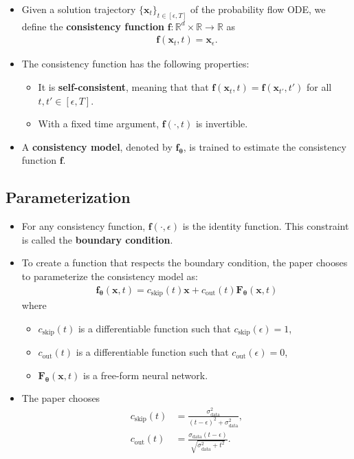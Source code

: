 \documentclass[10pt]{article}
\newcommand{\ve}[1]{\mathbf{#1}}
\newcommand{\ves}[1]{\boldsymbol{#1}}
\newcommand{\mrm}[1]{\mathrm{#1}}
\newcommand{\Real}{\mathbb{R}}
\newcommand{\data}{\mathrm{data}}
\begin{document}
\begin{itemize}
  \item Given a solution trajectory $\{ \ve{x}_t \}_{t \in [\epsilon,T]}$ of the probability flow ODE, we define the {\bf consistency function} $\ve{f}: \Real^d \times \Real \rightarrow \Real$ as
  \begin{align*}
    \ve{f}(\ve{x}_t, t) = \ve{x}_\epsilon.
  \end{align*}
  
  \item The consistency function has the following properties:
  \begin{itemize}
    \item It is {\bf self-consistent}, meaning that that $\ve{f}(\ve{x}_t, t) = \ve{f}(\ve{x}_{t'}, t')$ for all $t, t' \in [\epsilon, T]$.
    \item With a fixed time argument, $\ve{f}(\cdot, t)$ is invertible.
  \end{itemize}
  
  \item A {\bf consistency model}, denoted by $\ve{f}_{\ves{\theta}}$, is trained to estimate the consistency function $\ve{f}$.
\end{itemize}

\subsection{Parameterization}

\begin{itemize}
  \item For any consistency function, $\ve{f}(\cdot, \epsilon)$ is the identity function. This constraint is called the {\bf boundary condition}.
  
  \item To create a function that respects the boundary condition, the paper chooses to parameterize the consistency model as:
  \begin{align*}
    \ve{f}_{\ves{\theta}}(\ve{x}, t) = c_{\mrm{skip}}(t) \ve{x} + c_{\mrm{out}}(t) \ve{F}_{\ves{\theta}}(\ve{x},t)
  \end{align*}
  where
  \begin{itemize}
    \item $c_{\mrm{skip}}(t)$ is a differentiable function such that $c_{\mrm{skip}}(\epsilon) = 1$,
    \item $c_{\mrm{out}}(t)$ is a differentiable function such that $c_{\mrm{out}}(\epsilon) = 0$,
    \item $\ve{F}_{\ves{\theta}}(\ve{x},t)$ is a free-form neural network.
  \end{itemize}

  \item The paper chooses
  \begin{align*}
    c_{\mrm{skip}}(t) &= \frac{\sigma_{\data}^2}{(t - \epsilon)^2 + \sigma_{\data}^2}, \\
    c_{\mrm{out}}(t) &= \frac{\sigma_{\data} (t - \epsilon)}{\sqrt{\sigma_{\data}^2 + t^2}}.
  \end{align*}
\end{itemize}
\end{document}
